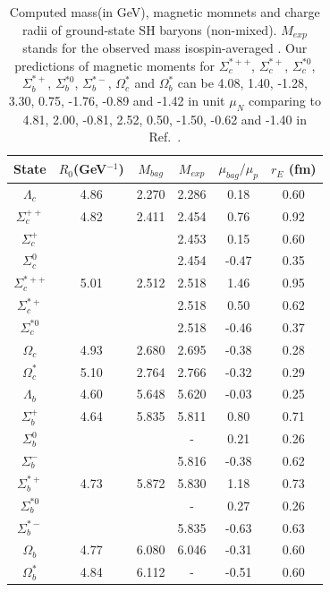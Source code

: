 \documentclass[12pt,prd,onecolumn,floatfix,nofootinbib]{revtex4}
\begin{document}
\renewcommand{\tabcolsep}{0.37cm} \renewcommand{\arraystretch}{1.1}
\begin{table}[!htb]
\caption{Computed mass(in GeV), magnetic momnets and charge radii of
ground-state SH baryons (non-mixed). $M_{exp}$ stands for the
observed mass isospin-averaged \protect\cite{Tanabashi:D18}. 
Our predictions of magnetic moments for $\Sigma_{c}^{\ast ++}$, 
$\Sigma_{c}^{\ast +}$, $\Sigma_{c}^{\ast 0}$, $\Sigma_{b}^{\ast +}$, 
$\Sigma_{b}^{\ast 0}$, $\Sigma_{b}^{\ast -}$, $\Omega_{c}^{\ast}$ 
and $\Omega_{b}^{\ast}$ can be 4.08, 1.40, -1.28, 3.30, 0.75, -1.76, -0.89 
and -1.42 in unit $\mu_{N}$ comparing to 4.81, 2.00, -0.81, 2.52, 0.50, -1.50, 
-0.62 and -1.40 in Ref.~\cite{Aliev:2008sk}.}
\label{tab:1heavybaryon}%
\begin{tabular}{cccccc}
\hline\hline
\textrm{State} & $R_{0}$(GeV$^{-1}$) & $M_{bag}$ & $M_{exp}$ \cite{Tanabashi:D18}
& $\mu_{bag}/\mu_{p}$ & $r_{E}$ (fm) \\ \hline
$\Lambda_{c}$ & 4.86 & 2.270 & 2.286 & 0.18 & 0.60 \\
$\Sigma_{c}^{++}$ & 4.82 & 2.411 & 2.454 & 0.76 & 0.92 \\
$\Sigma_{c}^{+}$ &  &  & 2.453 & 0.15 & 0.60 \\
$\Sigma_{c}^{0}$ &  &  & 2.454 & -0.47 & 0.35 \\
$\Sigma_{c}^{\ast ++}$ & 5.01 & 2.512 & 2.518 & 1.46 & 0.95 \\
$\Sigma_{c}^{\ast +}$ &  &  & 2.518 & 0.50 & 0.62 \\
$\Sigma_{c}^{\ast 0}$ &  &  & 2.518 & -0.46 & 0.37 \\
$\Omega_{c}$ & 4.93 & 2.680 & 2.695 & -0.38 & 0.28 \\
$\Omega_{c}^{\ast}$ & 5.10 & 2.764 & 2.766 & -0.32 & 0.29 \\
$\Lambda_{b}$ & 4.60 & 5.648 & 5.620 & -0.03 & 0.25 \\
$\Sigma_{b}^{+}$ & 4.64 & 5.835 & 5.811 & 0.80 & 0.71 \\
$\Sigma_{b}^{0}$ &  &  & - & 0.21 & 0.26 \\
$\Sigma_{b}^{-}$ &  &  & 5.816 & -0.38 & 0.62 \\
$\Sigma_{b}^{\ast +}$ & 4.73 & 5.872 & 5.830 & 1.18 & 0.73 \\
$\Sigma_{b}^{\ast 0}$ &  &  & - & 0.27 & 0.26 \\
$\Sigma_{b}^{\ast -}$ &  &  & 5.835 & -0.63 & 0.63 \\
$\Omega_{b}$ & 4.77 & 6.080 & 6.046 & -0.31 & 0.60 \\
$\Omega_{b}^{\ast}$ & 4.84 & 6.112 & - & -0.51 & 0.60 \\ \hline\hline
\end{tabular}%
\end{table}
\end{document}
